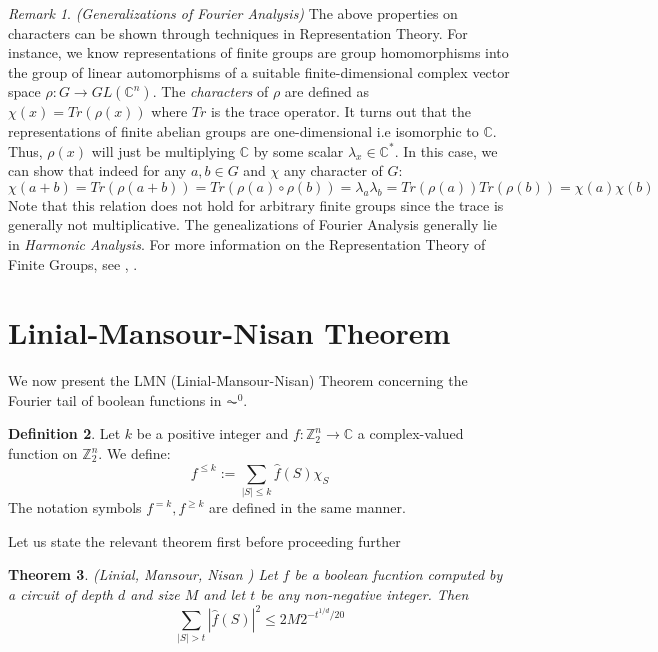 \documentclass{amsart}
\newtheorem{theorem}{Theorem}[section]
\theoremstyle{definition}
\newtheorem{definition}[theorem]{Definition}
\theoremstyle{remark}
\newtheorem{remark}[theorem]{Remark}
\numberwithin{equation}{section}
\theoremstyle{remark}
\begin{document}
\begin{remark}{\emph{(Generalizations of Fourier Analysis)}}
The above properties on characters can be shown through techniques in Representation Theory. For instance, we know representations of finite groups are group homomorphisms into the group of linear automorphisms of a suitable finite-dimensional complex vector space $\rho: G \rightarrow GL(\mathbb{C}^n)$. The \emph{characters} of $\rho$ are defined as $\chi(x) = Tr(\rho(x))$ where $Tr$ is the trace operator. It turns out that the representations of finite abelian groups are one-dimensional i.e isomorphic to $\mathbb{C}$. Thus, $\rho(x)$ will just be multiplying $\mathbb{C}$ by some scalar $\lambda_x \in \mathbb{C}^*$. In this case, we can show that indeed for any $a,b \in G$ and $\chi$ any character of $G$:
$$ \chi(a+b) = Tr(\rho(a+b)) = Tr(\rho(a)\circ\rho(b)) = \lambda_a \lambda_b = Tr(\rho(a))Tr(\rho(b)) = \chi(a)\chi(b)$$ Note that this relation does not hold for arbitrary finite groups since the trace is generally not multiplicative. The genealizations of Fourier Analysis generally lie in \emph{Harmonic Analysis}. For more information on the Representation Theory of Finite Groups, see \cite{serre}, \cite{webb}.
\end{remark}

\section{Linial-Mansour-Nisan Theorem}
We now present the LMN (Linial-Mansour-Nisan) Theorem concerning the Fourier tail of boolean functions in $\AC^0$.
\begin{definition}
  Let $k$ be a positive integer and $f:\mathbb{Z}_2^n \rightarrow \mathbb{C}$ a complex-valued function on $\mathbb{Z}_2^n$. We define: \newline
  $$f^{\leq k} := \sum_{|S| \leq k} \hat{f}(S)\chi_{S} $$
  The notation symbols $f^{=k},f^{\geq k}$ are defined in the same manner.
\end{definition}
%
\noindent Let us state the relevant theorem first before proceeding further
%
\begin{theorem} (Linial, Mansour, Nisan \cite{lmn}) \label{lmn}
    Let $f$ be a boolean fucntion computed by a circuit of depth $d$ and size $M$ and let $t$ be any non-negative integer. Then
    \begin{equation}
      \sum_{|S| > t} |\hat{f}(S)|^2 \leq 2M2^{-t^{1/d}/20}
    \end{equation}
\end{theorem}
\end{document}
